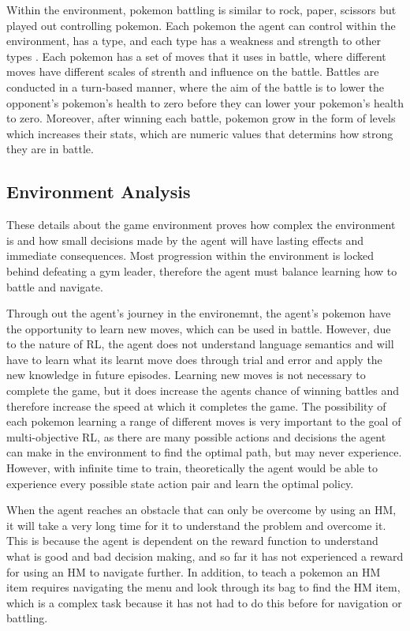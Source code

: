 Within the environment, pokemon battling is similar to rock, paper, scissors but played out controlling pokemon. Each pokemon the agent can control within the environment, has a type, and each type has a weakness and strength to other types \cite{SerebiiTeam2016}. Each pokemon has a set of moves that it uses in battle, where different moves have different scales of strenth and influence on the battle. Battles are conducted in a turn-based manner, where the aim of the battle is to lower the opponent's pokemon's health to zero before they can lower your pokemon's health to zero. Moreover, after winning each battle, pokemon grow in the form of levels which increases their stats, which are numeric values that determins how strong they are in battle. 


\subsection{Environment Analysis}

These details about the game environment proves how complex the environment is and how small decisions made by the agent will have lasting effects and immediate consequences. Most progression within the environment is locked behind defeating a gym leader, therefore the agent must balance learning how to battle and navigate. 

Through out the agent's journey in the environemnt, the agent's pokemon have the opportunity to learn new moves, which can be used in battle. However, due to the nature of RL, the agent does not understand language semantics and will have to learn what its learnt move does through trial and error and apply the new knowledge in future episodes. Learning new moves is not necessary to complete the game, but it does increase the agents chance of winning battles and therefore increase the speed at which it completes the game. The possibility of each pokemon learning a range of different moves is very important to the goal of multi-objective RL, as there are many possible actions and decisions the agent can make in the environment to find the optimal path, but may never experience. However, with infinite time to train, theoretically the agent would be able to experience every possible state action pair and learn the optimal policy. 

When the agent reaches an obstacle that can only be overcome by using an HM, it will take a very long time for it to understand the problem and overcome it. This is because the agent is dependent on the reward function to understand what is good and bad decision making, and so far it has not experienced a reward for using an HM to navigate further. In addition, to teach a pokemon an HM item requires navigating the menu and look through its bag to find the HM item, which is a complex task because it has not had to do this before for navigation or battling.

